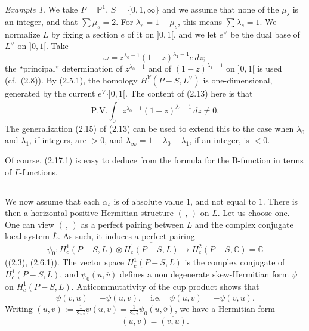\documentclass[12pt,a4paper]{article}
\theoremstyle{plain}
\theoremstyle{definition}
\theoremstyle{remark}
\newtheorem{example}[theorem]{Example}
\newcommand{\CC}{\mathbb{C}}
\newcommand{\PP}{\mathbb{P}}
\numberwithin{equation}{section}
\providecommand{\CC}{\mathbb{C}}
\providecommand{\PP}{\mathbb{P}}
\begin{document}
\begin{example}\label{ex:2.17}
We take $P = \PP^1$, $S = \{0, 1, \infty\}$ and we assume that none of the $\mu_s$ is an integer, and that $\sum \mu_s = 2$. For $\lambda_s = 1 - \mu_s$, this means $\sum \lambda_s = 1$. We normalize $L$ by fixing a section $e$ of it on $]0, 1[$, and we let $e^\vee$ be the dual base of $L^\vee$ on $]0, 1[$. Take
\[
\omega = z^{\lambda_0-1} (1-z)^{\lambda_1-1} e \, dz;
\]
the ``principal'' determination of $z^{\lambda_0-1}$ and of $(1-z)^{\lambda_1-1}$ on $]0, 1[$ is used (cf.\ (2.8)). By (2.5.1), the homology $H^{\mathrm{lf}}_1(P-S, L^\vee)$ is one-dimensional, generated by the current $e^\vee \cdot ]0, 1[$. The content of (2.13) here is that
\begin{equation}\label{eq:2.17.1}
\mathrm{P.V.} \int_0^1 z^{\lambda_0-1} (1-z)^{\lambda_1-1} \, dz \neq 0.
\end{equation}
The generalization (2.15) of (2.13) can be used to extend this to the case when $\lambda_0$ and $\lambda_1$, if integers, are $> 0$, and $\lambda_\infty = 1 - \lambda_0 - \lambda_1$, if an integer, is $< 0$.

Of course, (2.17.1) is easy to deduce from the formula for the B-function in terms of $\Gamma$-functions.
\end{example}

\subsection{}
We now assume that each $\alpha_s$ is of absolute value $1$, and not equal to $1$. There is then a horizontal positive Hermitian structure $(\,,\,)$ on $L$. Let us choose one. One can view $(\,,\,)$ as a perfect pairing between $L$ and the complex conjugate local system $\overline{L}$. As such, it induces a perfect pairing
\[
\psi_0: H^1_c(P-S, L) \otimes \overline{H^1_c(P-S, L)} \to H^2_c(P-S, \CC) = \CC
\]
((2.3), (2.6.1)). The vector space $\overline{H^1_c(P-S, L)}$ is the complex conjugate of $H^1_c(P-S, L)$, and $\psi_0(u, \overline{v})$ defines a non degenerate skew-Hermitian form $\psi$ on $H^1_c(P-S, L)$. Anticommutativity of the cup product shows that
\begin{equation}\label{eq:2.18.1}
\psi(v, u) = -\overline{\psi(u, v)}, \quad \text{i.e.}\quad \psi(u, v) = -\overline{\psi(v, u)}.
\end{equation}
Writing $(u, v) := \frac{1}{2\pi i} \psi(u, v) = \frac{1}{2\pi i} \psi_0(u, \overline{v})$, we have a Hermitian form
\begin{equation}\label{eq:2.18.2}
(u, v) = \overline{(v, u)}.
\end{equation}
\end{document}
